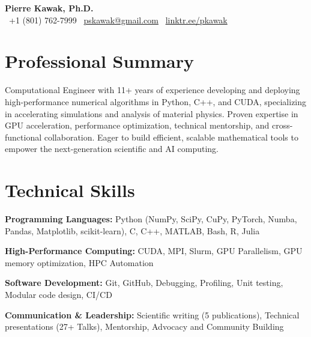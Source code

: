 \begin{center}
  {\LARGE \textbf{Pierre Kawak, Ph.D.}}\\
  \faPhone\ +1 (801) 762-7999 \quad \faEnvelope\ \href{mailto:pskawak@gmail.com}{pskawak@gmail.com} \quad \faLink\ \href{https://linktr.ee/pkawak}{linktr.ee/pkawak}
\end{center}
\vspace{-0.3\baselineskip}
\section*{Professional Summary}
Computational Engineer with 11+ years of experience developing and deploying high-performance numerical algorithms in Python, C++, and CUDA, specializing in accelerating simulations and analysis of material physics.
Proven expertise in GPU acceleration, performance optimization, technical mentorship, and cross-functional collaboration.
Eager to build efficient, scalable mathematical tools to empower the next-generation scientific and AI computing.
\vspace{-0.3\baselineskip}
\section*{Technical Skills}
\begin{tabitemize}[leftmargin=*]
  \item \textbf{Programming Languages:} Python (NumPy, SciPy, CuPy, PyTorch, Numba, Pandas, Matplotlib, scikit-learn), C, C++, MATLAB, Bash, R, Julia
  \item \textbf{High-Performance Computing:} CUDA, MPI, Slurm, GPU Parallelism, GPU memory optimization, HPC Automation
  \item \textbf{Software Development:} Git, GitHub, Debugging, Profiling, Unit testing, Modular code design, CI/CD
  \item \textbf{Communication \& Leadership:} Scientific writing (5 publications), Technical presentations (27+ Talks), Mentorship, Advocacy and Community Building
\end{tabitemize}
\vspace{-0.3\baselineskip}
